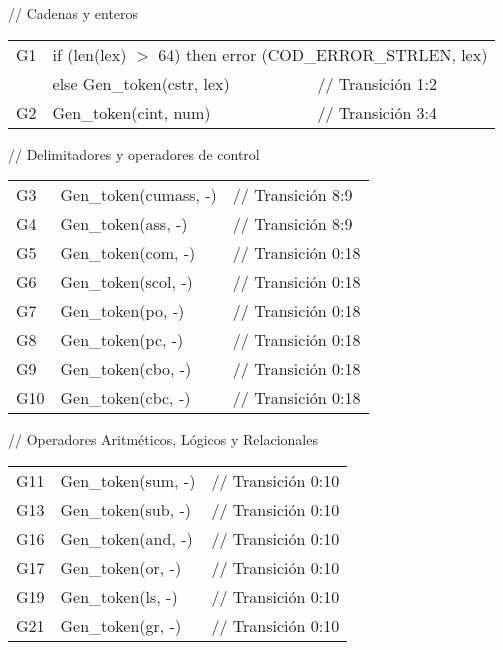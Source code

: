 \documentclass{article}
\begin{document}
{\small 
    
    \vspace{0.1cm}
    
    // Cadenas y enteros 
    
    \vspace{0.1cm}

    \begin{tabular}{p{1cm} p{5cm} p{7cm}}
    
        G1 & \multicolumn{2}{l}{ if (len(lex) \(>\) 64) then error (COD\_ERROR\_STRLEN, lex)} \\
        & else Gen\_token(cstr, lex)  & // Transición 1:2 \\
        G2 & Gen\_token(cint, num) & // Transición 3:4 
    \end{tabular}
    
    \vspace{0.2cm}
    
    // Delimitadores y operadores de control 
    
    \vspace{0.1cm}
    
    \begin{tabular}{p{1cm} p{5cm} p{3cm}}
        G3 & Gen\_token(cumass, -) & // Transición 8:9 \\
        G4 & Gen\_token(ass, -) & // Transición 8:9 \\
        G5 & Gen\_token(com, -) & // Transición 0:18 \\
        G6 & Gen\_token(scol, -) & // Transición 0:18 \\
        G7 & Gen\_token(po, -) & // Transición 0:18 \\
        G8 & Gen\_token(pc, -) & // Transición 0:18 \\
        G9 & Gen\_token(cbo, -) & // Transición 0:18 \\
        G10 & Gen\_token(cbc, -) & // Transición 0:18 \\
    \end{tabular}
    
    \vspace{0.2cm}
    
    // Operadores Aritméticos, Lógicos y Relacionales 
    
    \vspace{0.1cm}
    
    \begin{tabular}{p{1cm} p{5cm} p{3cm}}
        G11 & Gen\_token(sum, -) & // Transición 0:10 \\
        G13 & Gen\_token(sub, -) & // Transición 0:10 \\
        G16 & Gen\_token(and, -) & // Transición 0:10 \\
        G17 & Gen\_token(or, -) & // Transición 0:10 \\
        G19 & Gen\_token(ls, -) & // Transición 0:10 \\
        G21 & Gen\_token(gr, -) & // Transición 0:10 \\
    \end{tabular}
    
}
\end{document}
